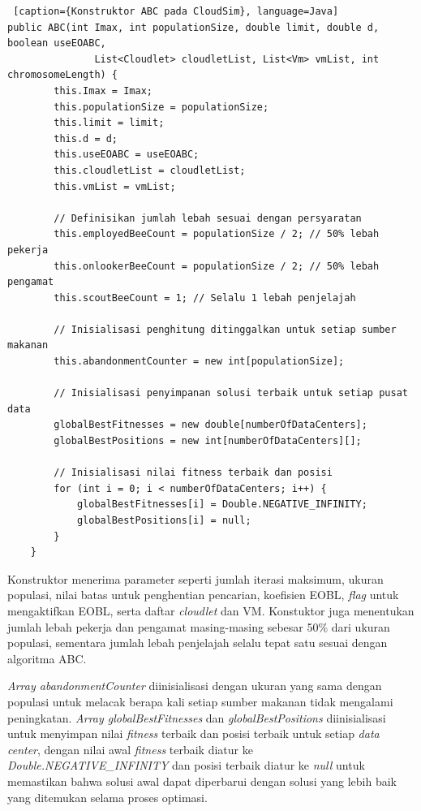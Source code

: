 \begin{lstlisting} [caption={Konstruktor ABC pada CloudSim}, language=Java]
public ABC(int Imax, int populationSize, double limit, double d, boolean useEOABC,
               List<Cloudlet> cloudletList, List<Vm> vmList, int chromosomeLength) {
        this.Imax = Imax;
        this.populationSize = populationSize;
        this.limit = limit;
        this.d = d;
        this.useEOABC = useEOABC;
        this.cloudletList = cloudletList;
        this.vmList = vmList;
        
        // Definisikan jumlah lebah sesuai dengan persyaratan
        this.employedBeeCount = populationSize / 2; // 50% lebah pekerja
        this.onlookerBeeCount = populationSize / 2; // 50% lebah pengamat
        this.scoutBeeCount = 1; // Selalu 1 lebah penjelajah
        
        // Inisialisasi penghitung ditinggalkan untuk setiap sumber makanan
        this.abandonmentCounter = new int[populationSize];
        
        // Inisialisasi penyimpanan solusi terbaik untuk setiap pusat data
        globalBestFitnesses = new double[numberOfDataCenters];
        globalBestPositions = new int[numberOfDataCenters][];

        // Inisialisasi nilai fitness terbaik dan posisi
        for (int i = 0; i < numberOfDataCenters; i++) {
            globalBestFitnesses[i] = Double.NEGATIVE_INFINITY;
            globalBestPositions[i] = null;
        }
    }
\end{lstlisting}

Konstruktor menerima parameter seperti jumlah iterasi maksimum, ukuran populasi, nilai batas untuk penghentian pencarian, koefisien EOBL, \textit{flag} untuk mengaktifkan EOBL, serta daftar \textit{cloudlet} dan VM. Konstuktor juga menentukan jumlah lebah pekerja dan pengamat masing-masing sebesar 50\% dari ukuran populasi, sementara jumlah lebah penjelajah selalu tepat satu sesuai dengan algoritma ABC. 

\textit{Array abandonmentCounter} diinisialisasi dengan ukuran yang sama dengan populasi untuk melacak berapa kali setiap sumber makanan tidak mengalami peningkatan. \textit{Array globalBestFitnesses} dan \textit{globalBestPositions} diinisialisasi untuk menyimpan nilai \textit{fitness} terbaik dan posisi terbaik untuk setiap \textit{data center}, dengan nilai awal \textit{fitness} terbaik diatur ke \textit{Double.NEGATIVE\_INFINITY} dan posisi terbaik diatur ke \textit{null} untuk memastikan bahwa solusi awal dapat diperbarui dengan solusi yang lebih baik yang ditemukan selama proses optimasi.

